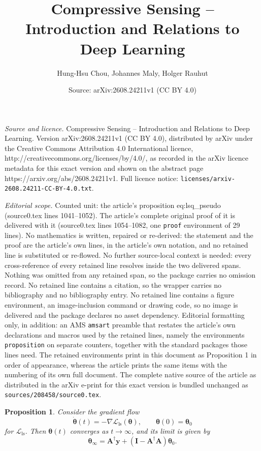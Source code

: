 \documentclass[10pt,a4paper]{amsart}
\title{Compressive Sensing -- Introduction and Relations to Deep Learning}
\author{Hung-Hsu Chou, Johannes Maly, Holger Rauhut}
\date{Source: arXiv:2608.24211v1 (CC BY 4.0)}
\newtheorem{proposition}{Proposition}
\def\Lls{\mathcal{L}_\text{ls}}
\newcommand{\bA}{\boldsymbol{A}}
\newcommand{\bI}{\boldsymbol{I}}
\newcommand{\btheta}{{\boldsymbol{\theta}}}
\newcommand{\by}{\boldsymbol{y}}
\begin{document}
\maketitle

\noindent\emph{Source and licence.} Compressive Sensing -- Introduction and Relations to Deep Learning. Version arXiv:2608.24211v1 (CC BY 4.0), distributed by arXiv under the Creative Commons Attribution 4.0 International licence, http://creativecommons.org/licenses/by/4.0/, as recorded in the arXiv licence metadata for this exact version and shown on the abstract page https://arxiv.org/abs/2608.24211v1. Full licence notice: \texttt{licenses/arxiv-2608.24211-CC-BY-4.0.txt}.\par\smallskip

\noindent\textit{Editorial scope.} Counted unit: the article's proposition eq:lsq\_pseudo (source0.tex lines 1041--1052). The article's complete original proof of it is delivered with it (source0.tex lines 1054--1082, one \texttt{proof} environment of 29 lines). No mathematics is written, repaired or re-derived: the statement and the proof are the article's own lines, in the article's own notation, and no retained line is substituted or re-flowed.  No further source-local context is needed: every cross-reference of every retained line resolves inside the two delivered spans.  Nothing was omitted from any retained span, so the package carries no omission record.  No retained line contains a citation, so the wrapper carries no bibliography and no bibliography entry.  No retained line contains a figure environment, an image-inclusion command or drawing code, so no image is delivered and the package declares no asset dependency.  Editorial formatting only, in addition: an AMS \texttt{amsart} preamble that restates the article's own declarations and macros used by the retained lines, namely the environments \texttt{proposition} on separate counters, together with the standard packages those lines need.  The retained environments print in this document as Proposition 1 in order of appearance, whereas the article prints the same items with the numbering of its own full document.  The complete native source of the article as distributed in the arXiv e-print for this exact version is bundled unchanged as \texttt{sources/208458/source0.tex}.
\begin{proposition}
Consider the gradient flow
\begin{equation}\label{eq:lsq_pseudo}
    \dot{\btheta}(t)=-\nabla\Lls(\btheta), \qquad \btheta(0)=\btheta_0
\end{equation}
for $\Lls$.
Then $\btheta(t)$ converges as $t\to\infty$, and its limit is given by
\begin{equation*}
    \btheta_\infty=\bA^\dagger\by+(\bI-\bA^\dagger\bA)\btheta_0.
\end{equation*}
\end{proposition}
\end{document}
